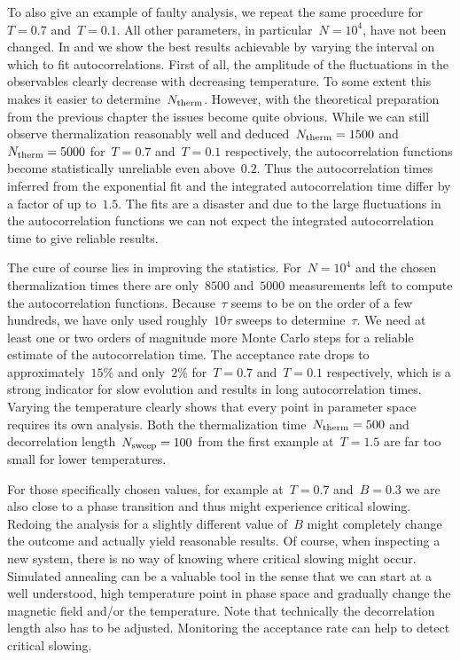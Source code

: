 To also give an example of faulty analysis, we repeat the same procedure
for~$T=0.7$ and~$T=0.1$. All other parameters, in particular~$N=10^4$, have not
been changed. In  and  we show the best
results achievable by varying the interval on which to fit autocorrelations.
First of all, the amplitude of the fluctuations in the observables clearly
decrease with decreasing temperature. To some extent this makes it easier to
determine~$N_{\mathrm{therm}}$.  However, with the theoretical preparation from the
previous chapter the issues become quite obvious. While we can still observe
thermalization reasonably well and deduced~$N_{\mathrm{therm}}=1500$ and~$N_{\mathrm{therm}}=5000$
for~$T=0.7$ and~$T=0.1$ respectively, the autocorrelation functions become
statistically unreliable even above~$0.2$. Thus the autocorrelation times
inferred from the exponential fit and the integrated autocorrelation time differ
by a factor of up to~$1.5$. The fits are a disaster and due to the large
fluctuations in the autocorrelation functions we can not expect the integrated
autocorrelation time to give reliable results.

The cure of course lies in improving the statistics. For~$N=10^4$ and the chosen
thermalization times there are only~$8500$ and~$5000$ measurements left to
compute the autocorrelation functions.  Because~$\tau$ seems to be on the order
of a few hundreds, we have only used roughly~$10 \tau$ sweeps to
determine~$\tau$. We need at least one or two orders of magnitude more Monte
Carlo steps for a reliable estimate of the autocorrelation time. The acceptance
rate drops to approximately~$15$\% and only~$2$\% for~$T=0.7$ and~$T=0.1$
respectively, which is a strong indicator for slow evolution and results in long
autocorrelation times. Varying the temperature clearly shows that every point in
parameter space requires its own analysis. Both the thermalization
time~$N_{\mathrm{therm}}=500$ and decorrelation length~$N_{\mathrm{sweep}}=100$ from the first example
at~$T=1.5$ are far too small for lower temperatures.

For those specifically chosen values, for example at~$T=0.7$ and~$B=0.3$ we are
also close to a phase transition and thus might experience critical slowing.
Redoing the analysis for a slightly different value of~$B$ might completely
change the outcome and actually yield reasonable results. Of course, when
inspecting a new system, there is no way of knowing where critical slowing might
occur. Simulated annealing can be a valuable tool in the sense that we can start
at a well understood, high temperature point in phase space and gradually change
the magnetic field and/or the temperature. Note that technically the
decorrelation length also has to be adjusted. Monitoring the acceptance rate can
help to detect critical slowing.

